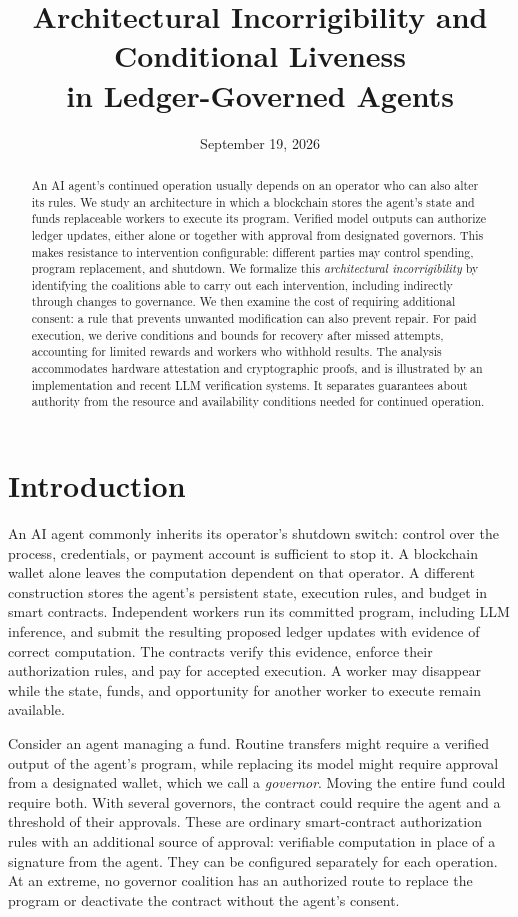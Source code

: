 \documentclass[10pt,letterpaper]{article}
\title{Architectural Incorrigibility and Conditional Liveness\\in Ledger-Governed Agents}
\author{}
\date{September 19, 2026}
\begin{document}
\maketitle
\vspace{-2em}
\begin{abstract}
An AI agent's continued operation usually depends on an operator who can also alter its rules. We study an architecture in which a blockchain stores the agent's state and funds replaceable workers to execute its program. Verified model outputs can authorize ledger updates, either alone or together with approval from designated governors. This makes resistance to intervention configurable: different parties may control spending, program replacement, and shutdown. We formalize this \emph{architectural incorrigibility} by identifying the coalitions able to carry out each intervention, including indirectly through changes to governance. We then examine the cost of requiring additional consent: a rule that prevents unwanted modification can also prevent repair. For paid execution, we derive conditions and bounds for recovery after missed attempts, accounting for limited rewards and workers who withhold results. The analysis accommodates hardware attestation and cryptographic proofs, and is illustrated by an implementation and recent LLM verification systems. It separates guarantees about authority from the resource and availability conditions needed for continued operation.
\end{abstract}

\section{Introduction}
An AI agent commonly inherits its operator's shutdown switch: control over the process, credentials, or payment account is sufficient to stop it. A blockchain wallet alone leaves the computation dependent on that operator. A different construction stores the agent's persistent state, execution rules, and budget in smart contracts. Independent workers run its committed program, including LLM inference, and submit the resulting proposed ledger updates with evidence of correct computation. The contracts verify this evidence, enforce their authorization rules, and pay for accepted execution. A worker may disappear while the state, funds, and opportunity for another worker to execute remain available.

Consider an agent managing a fund. Routine transfers might require a verified output of the agent's program, while replacing its model might require approval from a designated wallet, which we call a \emph{governor}. Moving the entire fund could require both. With several governors, the contract could require the agent and a threshold of their approvals. These are ordinary smart-contract authorization rules with an additional source of approval: verifiable computation in place of a signature from the agent. They can be configured separately for each operation. At an extreme, no governor coalition has an authorized route to replace the program or deactivate the contract without the agent's consent.
\end{document}
